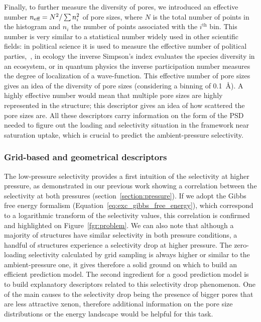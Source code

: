 \documentclass[main]{subfiles}
\begin{document}
Finally, to further measure the diversity of pores, we introduced an effective number $n_{\text{eff}} = N^2/\sum n_i^2$ of pore sizes, where $N$ is the total number of points in the histogram and $n_i$ the number of points associated with the $i^\text{th}$ bin. This number is very similar to a statistical number widely used in other scientific fields: in political science it is used to measure the effective number of political parties,~\autocite{neffposci_Laakso1979}, in ecology the inverse Simpson's index evaluates the species diversity in an ecosystem,\autocite{neffbio_Simpson1949} or in quantum physics the inverse participation number measures the degree of localization of a wave-function.\autocite{neffphys_Kramer1993} This effective number of pore sizes gives an idea of the diversity of pore sizes (considering a binning of \SI{0.1}{\angstrom}). A highly effective number would mean that multiple pore sizes are highly represented in the structure; this descriptor gives an idea of how scattered the pore sizes are.
All these descriptors carry information on the form of the PSD needed to figure out the loading and selectivity situation in the framework near saturation uptake, which is crucial to predict the ambient-pressure selectivity.

\subsubsection{Grid-based and geometrical descriptors}

The low-pressure selectivity provides a first intuition of the selectivity at higher pressure, as demonstrated in our previous work showing a correlation between the selectivity at both pressures (section~\ref{section:pressure}). If we adopt the Gibbs free energy formalism (Equation~\ref{eq:exc_gibbs_free_energy}), which correspond to a logarithmic transform of the selectivity values, this correlation is confirmed and highlighted on Figure~\ref{fgr:problem}. We can also note that although a majority of structures have similar selectivity in both pressure conditions, a handful of structures experience a selectivity drop at higher pressure. The zero-loading selectivity calculated by grid sampling is always higher or similar to the ambient-pressure one, it gives therefore a solid ground on which to build an efficient prediction model. The second ingredient for a good prediction model is to build explanatory descriptors related to this selectivity drop phenomenon. One of the main causes to the selectivity drop being the presence of bigger pores that are less attractive xenon, therefore additional information on the pore size distributions or the energy landscape would be helpful for this task.
\end{document}

